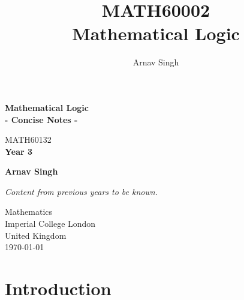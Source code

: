 \documentclass[a4paper]{article}
\author{Arnav Singh}
\title{MATH60002\\Mathematical Logic}
\begin{document}
\begin{titlepage}
    \begin{center}
        \vspace*{1cm}
         
         \huge
        \textbf{Mathematical Logic\\ - Concise Notes -}
 
        \vspace{0.5cm}
         MATH60132\\
         \vspace{0.25cm}
         \large
         \textbf{Year 3}
             
        \vspace{1.5cm}
         
         \LARGE
        \textbf{Arnav Singh}
        
        \vspace{1.2cm}
 
             
        
             
        \vspace{1.8cm}
        
         \normalsize
        \vspace{0.2cm}
        
         \textit{Content from previous years to be known.}
         
         \vfill
             
        Mathematics\\
        Imperial College London\\
        United Kingdom\\
        \today
             
    \end{center}
 \end{titlepage}

 \tableofcontents

\pagebreak

\setcounter{section}{-1}
\section{Introduction}
\end{document}
